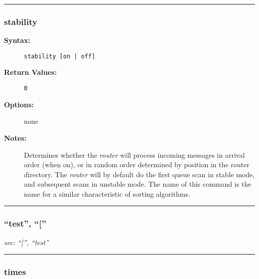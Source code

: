 \hrule
\subsubsection{stability}

\begin{description}
\item[{\bf Syntax:}] \mbox{}

{\tt stability [on \verb/|/ off]}

\item[{\bf Return Values:}] \mbox{}

\begin{description}
\item[{\tt 0}] \mbox{}



\end{description}


\item[{\bf Options:}] \mbox{}

none  

\item[{\bf Notes:}] \mbox{}

Determines whether the {\em router} will 
process incoming messages in arrival order (when on), or in random 
order determined by position in the router directory. The {\em router} 
will by default do the first queue scan in stable mode, and subsequent 
scans in unstable mode. The name of this command is the name for a 
similar characteristic of sorting algorithms. 

\end{description}


\hrule
\subsubsection{``test'', ``[''}

{\em see: ``['', ``test''}

\hrule
\subsubsection{times}

